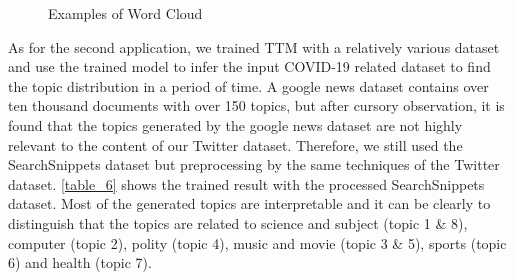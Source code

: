 \begin{figure}[htbp]
\centering
{}%
%

%
%
\centering
\caption{Examples of Word Cloud}
\label{fig:9}
\end{figure}

As for the second application, we trained TTM with a relatively various dataset and use the trained model to infer the input COVID-19 related dataset to find the topic distribution in a period of time. A google news dataset contains over ten thousand documents with over 150 topics, but after cursory observation, it is found that the topics generated by the google news dataset are not highly relevant to the content of our Twitter dataset. Therefore, we still used the SearchSnippets dataset but preprocessing by the same techniques of the Twitter dataset. \ref{table_6} shows the trained result with the processed SearchSnippets dataset. Most of the generated topics are interpretable and it can be clearly to distinguish that the topics are related to science and subject (topic 1 \& 8), computer (topic 2), polity (topic 4), music and movie (topic 3 \& 5), sports (topic 6) and health (topic 7).


